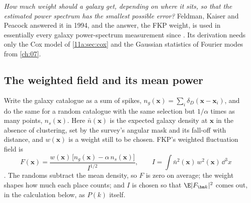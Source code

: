 \emph{How much weight should a galaxy get, depending on
where it sits, so that the estimated power spectrum has the smallest possible
error?} Feldman, Kaiser and Peacock answered it in 1994, and the answer, the FKP
weight, is used in essentially every galaxy power-spectrum measurement since
\cite{FKP1994}. Its derivation needs only the Cox model of \cref{11a:sec:cox} and
the Gaussian statistics of Fourier modes from \cref{ch:07}.

\subsection{The weighted field and its mean power}
\label{11a:sec:fkp-mean}

Write the galaxy catalogue as a sum of spikes,
$n_g(\bm x)=\sum_i\delta_D(\bm x-\bm x_i)$, and do the same for a random catalogue
with the same selection but $1/\alpha$ times as many points, $n_s(\bm x)$. Here
$\bar n(\bm x)$ is the expected galaxy density at $\bm x$ in the absence of
clustering, set by the survey's angular mask and its fall-off with distance, and
$w(\bm x)$ is a weight still to be chosen. FKP's weighted fluctuation field is
\begin{equation}
  F(\bm x)=\frac{w(\bm x)\,\bigl[n_g(\bm x)-\alpha\,n_s(\bm x)\bigr]}{I^{1/2}},
  \qquad I=\int\bar n^2(\bm x)\,w^2(\bm x)\,\dd^3x
  \label{11a:eq:fkp-field}
\end{equation}
. The randoms subtract the mean density, so $F$ is
zero on average; the weight shapes how much each place counts; and $I$ is chosen
so that $\E|F_{\bm k}|^2$ comes out, in the calculation below, as $P(k)$ itself.

